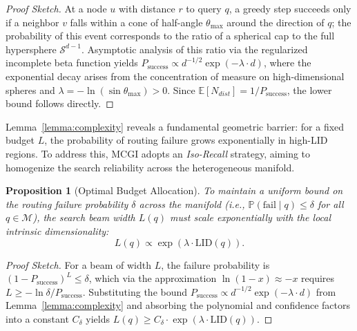 \documentclass{article}
\theoremstyle{plain}
\newtheorem{proposition}[theorem]{Proposition}
\theoremstyle{definition}
\theoremstyle{remark}
\newcommand{\ours}{MCGI\xspace}
\begin{document}
\begin{proof}[Proof Sketch]
At a node $u$ with distance $r$ to query $q$, a greedy step succeeds only if a neighbor $v$ falls within a cone of half-angle $\theta_{\max}$ around the direction of $q$; the probability of this event corresponds to the ratio of a spherical cap to the full hypersphere $\mathcal{S}^{d-1}$.
Asymptotic analysis of this ratio via the regularized incomplete beta function yields $P_{\text{success}} \propto d^{-1/2} \exp(-\lambda \cdot d)$, where the exponential decay arises from the concentration of measure on high-dimensional spheres and $\lambda = -\ln(\sin\theta_{\max}) > 0$.
Since $\mathbb{E}[N_{dist}] = 1/P_{\text{success}}$, the lower bound follows directly.
\end{proof}

Lemma~\ref{lemma:complexity} reveals a fundamental geometric barrier: for a fixed budget $L$, the probability of routing failure grows exponentially in high-LID regions. To address this, \ours{} adopts an \textit{Iso-Recall} strategy, aiming to homogenize the search reliability across the heterogeneous manifold.

\begin{proposition}[Optimal Budget Allocation]
\label{thm:oba}
To maintain a uniform bound on the routing failure probability $\delta$ across the manifold (i.e., $\mathbb{P}(\text{fail}\;|\;q) \le \delta$ for all $q \in \mathcal{M}$), the search beam width $L(q)$ must scale exponentially with the local intrinsic dimensionality:
\begin{equation}
    L(q) \propto \exp\left( \lambda \cdot \text{LID}(q) \right).
\end{equation}
\end{proposition}

\begin{proof}[Proof Sketch]
For a beam of width $L$, the failure probability is $(1 - P_{\text{success}})^L \leq \delta$, which via the approximation $\ln(1-x) \approx -x$ requires $L \geq -\ln\delta / P_{\text{success}}$.
Substituting the bound $P_{\text{success}} \propto d^{-1/2}\exp(-\lambda \cdot d)$ from Lemma~\ref{lemma:complexity} and absorbing the polynomial and confidence factors into a constant $C_\delta$ yields $L(q) \geq C_\delta \cdot \exp(\lambda \cdot \text{LID}(q))$.
\end{proof}
\end{document}
